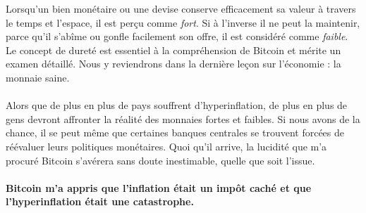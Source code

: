 Lorsqu'un bien monétaire ou une devise conserve efficacement sa valeur à travers
le temps et l'espace, il est perçu comme \textit{fort}. Si à l'inverse il ne
peut la maintenir, parce qu'il s'abîme ou gonfle facilement son offre, il est
considéré comme \textit{faible}. Le concept de dureté est essentiel à la
compréhension de Bitcoin et mérite un examen détaillé. Nous y reviendrons dans
la dernière leçon sur l'économie : la monnaie saine.

\paragraph{}
Alors que de plus en plus de pays souffrent d'hyperinflation, de plus en plus de
gens devront affronter la réalité des monnaies fortes et faibles. Si nous avons
de la chance, il se peut même que certaines banques centrales se trouvent
forcées de réévaluer leurs politiques monétaires. Quoi qu'il arrive, la lucidité
que m'a procuré Bitcoin s'avérera sans doute inestimable, quelle que soit
l'issue.

\paragraph{Bitcoin m'a appris que l'inflation était un impôt caché et que
l'hyperinflation était une catastrophe.}

%
%
%
%
%
